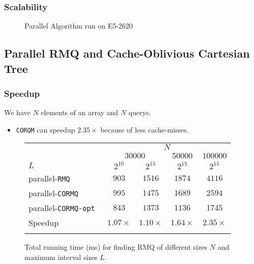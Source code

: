 \begin{frame}
	\frametitle{Scalability}
	\begin{figure}[!ht]
		\centering
		\subfigure[Scalability]{
			
			\label{fig:fig-parallel}
		}
		\caption{Parallel Algorithm run on E5-2620}
	\end{figure}
\end{frame}

\subsection{Parallel RMQ and Cache-Oblivious Cartesian Tree}
\begin{frame}
	\frametitle{Speedup}
	We have $N$ elements of an array and $N$ querys.
	\begin{itemize}
		\setlength\itemsep{1em}
		\item \texttt{CORQM} can speedup $2.35\times$ because of less cache-misses.
	\end{itemize}
	\begin{figure}[!ht]
		\begin{center}
			\begin{tabular}{l c c c c}
				\firsthline
					& \multicolumn{4}{c}{$N$} \\
					\cline{2-5}
						& \multicolumn{2}{c}{$30000$} & $50000$ & $100000$ \\
					$L$ & $2^{10}$ & $2^{15}$ & $2^{15}$ & $2^{15}$ \\
					\hline
					parallel-\tt{RMQ}   	& $903$ & $1516$ & $1874$ & $4116$ \\
					parallel-\tt{CORMQ} 	& $995$ & $1475$ & $1689$ & $2594$ \\
					parallel-\tt{CORMQ-opt} & $843$ & $1373$ & $1136$ & $1745$ \\
					\hline
					Speedup & $1.07\times$ & $1.10\times$ & $1.64\times$ & $2.35\times$\\
				\lasthline
			\end{tabular}
			\caption{Total running time (ms) for finding RMQ of different sizes $N$ and maximum interval sizes $L$.}
			\label{fig:CORMQ}
		\end{center}
	\end{figure}
\end{frame}